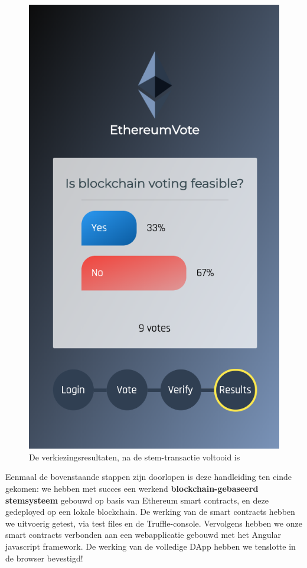 \begin{figure}
		\includegraphics[width=\linewidth/3]{img/screen_results.png}
		\caption{De verkiezingsresultaten, na de stem-transactie voltooid is}
		\label{fig:screen_voting3}
	\end{figure}

	Eenmaal de bovenstaande stappen zijn doorlopen is deze handleiding ten einde gekomen: we hebben met succes een werkend \textbf{blockchain-gebaseerd stemsysteem} gebouwd op basis van Ethereum smart contracts, en deze gedeployed op een lokale blockchain. De werking van de smart contracts hebben we uitvoerig getest, via test files en de Truffle-console. Vervolgens hebben we onze smart contracts verbonden aan een webapplicatie gebouwd met het Angular javascript framework. De werking van de volledige DApp hebben we tenslotte in de browser bevestigd! 
	
